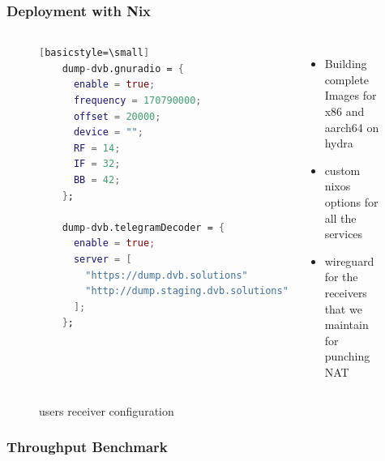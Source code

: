 
\begin{frame}[fragile]
\frametitle{Deployment with Nix}
\begin{figure}
\begin{columns}
  \begin{center}
  \begin{lstlisting}[language=Nix][basicstyle=\small]
    dump-dvb.gnuradio = {
      enable = true;
      frequency = 170790000;
      offset = 20000;
      device = "";
      RF = 14;
      IF = 32;
      BB = 42;
    };

    dump-dvb.telegramDecoder = {
      enable = true;
      server = [
        "https://dump.dvb.solutions"
        "http://dump.staging.dvb.solutions"
      ];
    };
  \end{lstlisting}
  \caption{users receiver configuration}
\end{center}
\raggedright
\vspace{0.5cm}
\begin{itemize}
  \item Building complete Images for x86 and aarch64 on hydra
  \item custom nixos options for all the services
  \item wireguard for the receivers that we maintain for punching NAT
\end{itemize}

\end{columns}
\end{figure}
\end{frame}


\begin{frame}
\frametitle{Throughput Benchmark}

\begin{figure}[h!]
  \begin{center}
  \end{center}
\end{figure}


\end{frame}

